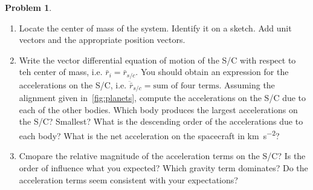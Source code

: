 \documentclass[10pt]{article}
\theoremstyle{definition}
\newtheorem{prob}{Problem}[section]
\newenvironment{subprob}%
{\renewcommand{\theenumi}{\alph{enumi}}\renewcommand{\labelenumi}{(\theenumi)}\begin{enumerate}}%
{\end{enumerate}}%
\begin{document}
\begin{prob}
    \begin{subprob}
    \item Locate the center of mass of the system. 
        Identify it on a sketch.
        Add unit vectors and the appropriate position vectors.
    \item Write the vector differential equation of motion of the S/C with respect to teh center of mass, i.e. \( \bar r_i = \bar r_{s/c}\).
        You should obtain an expression for the accelerations on the S/C, i.e. \( \ddot \bar r_{s/c} = \text{sum of four terms} \).
        Assuming the alignment given in~\cref{fig:planets}, compute the accelerations on the S/C due to each of the other bodies.
        Which body produces the largest accelerations on the S/C?
        Smallest?
        What is the descending order of the accelerations due to each body?
        What is the net acceleration on the spacecraft in \si{\kilo\meter\per\second\squared}?
    \item Cmopare the relative magnitude of the acceleration terms on the S/C?
        Is the order of influence what you expected?
        Which gravity term dominates?
        Do the acceleration terms seem consistent with your expectations?
    \end{subprob}
\end{prob}
\end{document}
